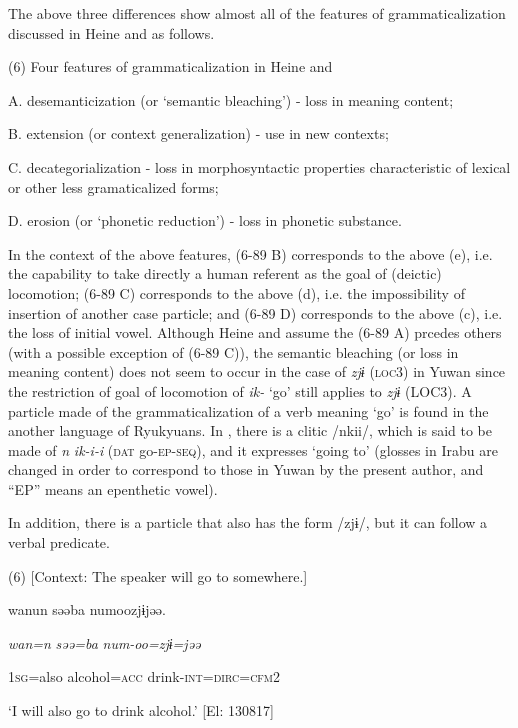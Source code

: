 The above three differences show almost all of the features of grammaticalization discussed in Heine and \citet[2]{Kuteva2002} as follows.

(6) Four features of grammaticalization in Heine and \citet[2]{Kuteva2002}

A.  desemanticization (or ‘semantic bleaching’) - loss in meaning content;

B.  extension (or context generalization) - use in new contexts;

C.    decategorialization - loss in morphosyntactic properties characteristic of lexical or other less gramaticalized forms;

D.  erosion (or ‘phonetic reduction’) - loss in phonetic substance.

In the context of the above features, (6-89 B) corresponds to the above (e), i.e. the capability to take directly a human referent as the goal of (deictic) locomotion; (6-89 C) corresponds to the above (d), i.e. the impossibility of insertion of another case particle; and (6-89 D) corresponds to the above (c), i.e. the loss of initial vowel. Although Heine and \citet[3]{Kuteva2002} assume the (6-89 A) prcedes others (with a possible exception of (6-89 C)), the semantic bleaching (or loss in meaning content) does not seem to occur in the case of \textit{zjɨ} (\textsc{loc}3) in Yuwan since the restriction of goal of locomotion of \textit{ik-} ‘go’ still applies to \textit{zjɨ} (LOC3). A particle made of the grammaticalization of a verb meaning ‘go’ is found in the another language of Ryukyuans. In \citet[207]{Shimoji2008}, there is a clitic /nkii/, which is said to be made of \textit{n} \textit{ik-i-i} (\textsc{dat} go-\textsc{ep}-\textsc{seq}), and it expresses ‘going to’ (glosses in Irabu are changed in order to correspond to those in Yuwan by the present author, and “EP” means an epenthetic vowel).

  In addition, there is a particle that also has the form /zjɨ/, but it can follow a verbal predicate.

(6)  [Context: The speaker will go to somewhere.]

{\TM}
\gll wanun  səəba  numoozjɨjəə.

    \textit{wan=n}  \textit{səə=ba}  \textit{num-oo=zjɨ=jəə}

    1\textsc{sg}=also  alcohol=\textsc{acc}  drink-\textsc{int}=\textsc{dirc}=\textsc{cfm}2

\glt    ‘I will also go to drink alcohol.’ [El: 130817]

